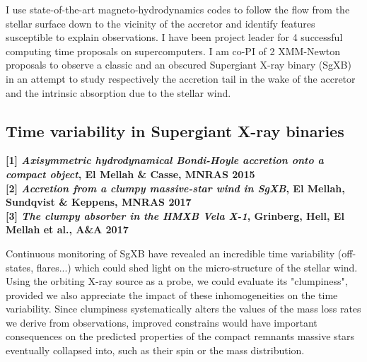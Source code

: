 \documentclass[letterpaper,12pt,onecolumn]{article}
\makeatletter
\newcommand{\sgx}{SgXB\xspace}
\newcommand*{\hmxb}{HMXB\@\xspace}
\makeatother
\begin{document}
I use state-of-the-art magneto-hydrodynamics codes to follow the flow from the stellar surface down to the vicinity of the accretor and identify features susceptible to explain observations. I have been project leader for 4 successful computing time proposals on supercomputers. I am co-PI of 2 XMM-Newton proposals to observe a classic and an obscured Supergiant X-ray binary (\sgx) in an attempt to study respectively the accretion tail in the wake of the accretor and the intrinsic absorption due to the stellar wind. 

\subsection*{Time variability in Supergiant X-ray binaries}

\footnotesize
\textbf{[1] \textit{Axisymmetric hydrodynamical Bondi-Hoyle accretion onto a compact object}, El Mellah \& Casse, MNRAS 2015}\\
\textbf{[2] \textit{Accretion from a clumpy massive-star wind in SgXB}, El Mellah, Sundqvist \& Keppens, MNRAS 2017}\\
\textbf{[3] \textit{The clumpy absorber in the HMXB Vela X-1}, Grinberg, Hell, El Mellah et al., A\&A 2017}\\

\normalsize


Continuous monitoring of \sgx have revealed an incredible time variability (off-states, flares...) which could shed light on the micro-structure of the stellar wind. Using the orbiting X-ray source as a probe, we could evaluate its "clumpiness", provided we also appreciate the impact of these inhomogeneities on the time variability. Since clumpiness systematically alters the values of the mass loss rates we derive from observations, improved constrains would have important consequences on the predicted properties of the compact remnants massive stars eventually collapsed into, such as their spin or the mass distribution.\\
\end{document}
